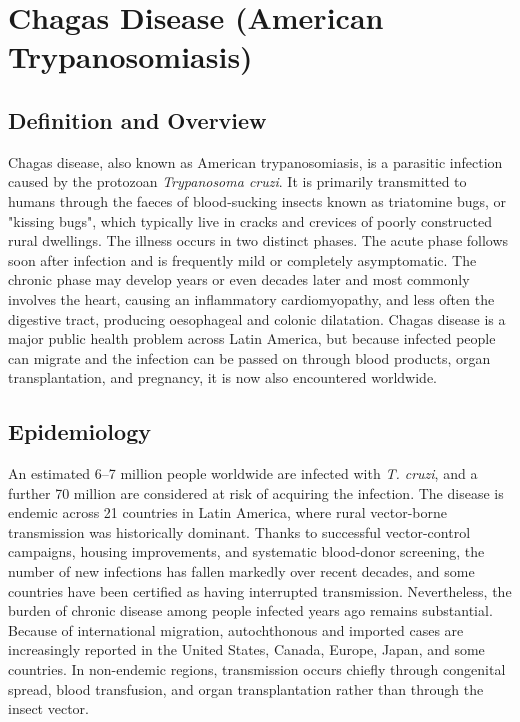 \chapter{Chagas Disease (American Trypanosomiasis)}

\section*{Definition and Overview}
Chagas disease, also known as American trypanosomiasis, is a parasitic infection caused by the protozoan \textit{Trypanosoma cruzi}. It is primarily transmitted to humans through the faeces of blood-sucking insects known as triatomine bugs, or "kissing bugs", which typically live in cracks and crevices of poorly constructed rural dwellings. The illness occurs in two distinct phases. The acute phase follows soon after infection and is frequently mild or completely asymptomatic. The chronic phase may develop years or even decades later and most commonly involves the heart, causing an inflammatory cardiomyopathy, and less often the digestive tract, producing oesophageal and colonic dilatation. Chagas disease is a major public health problem across Latin America, but because infected people can migrate and the infection can be passed on through blood products, organ transplantation, and pregnancy, it is now also encountered worldwide.

\section*{Epidemiology}
An estimated 6--7 million people worldwide are infected with \textit{T. cruzi}, and a further 70 million are considered at risk of acquiring the infection. The disease is endemic across 21 countries in Latin America, where rural vector-borne transmission was historically dominant. Thanks to successful vector-control campaigns, housing improvements, and systematic blood-donor screening, the number of new infections has fallen markedly over recent decades, and some countries have been certified as having interrupted transmission. Nevertheless, the burden of chronic disease among people infected years ago remains substantial. Because of international migration, autochthonous and imported cases are increasingly reported in the United States, Canada, Europe, Japan, and some countries. In non-endemic regions, transmission occurs chiefly through congenital spread, blood transfusion, and organ transplantation rather than through the insect vector.

